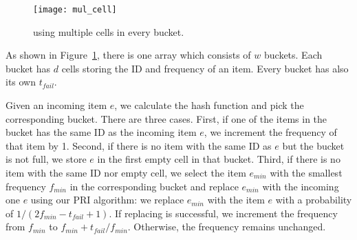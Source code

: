\begin{comment}
\ppp{Advantages and Disadvantages:}
Compared with the memory hungry Stream-Summary, using multiple arrays minimizes the memory usage thanks to the following two reasons.
%
First, there is no pointer in this data structure. Second, since the number of items is far larger than that of buckets, there are few, if any, empty buckets.
%
Given the same memory space, using multiple arrays outperforms Stream-Summary to a large extent in terms of accuracy.  
%
However, the time complexity of insertions is $O(d)$, where $d$ is the number of arrays. 
%
Although $d$ can be small (\eg, 3 or 4), we still wish to reduce the time complexity to $O(1)$, without sacrificing accuracy or memory efficiency. 
%
Therefore, we propose the final optimization in the following subsection.
\end{comment}


 
 \begin{figure}[htbp]
	\centering
	\prefig \vspace{-0.05in}
	\texttt{[image: mul\_cell]}
	\prefigcaption \vspace{-0.05in} \vspace{-0.05in}
	\caption{\aname{} using multiple cells in every bucket.}
	\label{draw:mul_cell}
	\postfig \vspace{-0.05in}
\end{figure}

As shown in Figure~\ref{draw:mul_cell}, there is one array which consists of $w$ buckets. 
%
Each bucket has $d$ cells storing the ID and frequency of an item. Every bucket has also its own $t_{fail}$.

Given an incoming item $e$, we calculate the hash function and pick the corresponding bucket.  
%
There are three cases. First, if one of the items in the bucket has the same ID as the incoming item $e$, we increment the frequency of that item by 1. 
%
Second, if there is no item with the same ID as $e$ but the bucket is not full, we store $e$ in the first empty cell in that bucket. 
%
Third, if there is no item with the same ID nor empty cell, we select the item $e_{min}$ with the smallest frequency $f_{min}$ in the corresponding bucket and replace $e_{min}$ with the incoming one $e$ using our PRI algorithm: we replace $e_{min}$ with the item $e$ with a probability of $1/(2f_{min}-t_{fail}+1)$. If replacing is successful, we increment the frequency from $f_{min}$ to $f_{min}+t_{fail}/f_{min}$. Otherwise, the frequency remains unchanged. 

